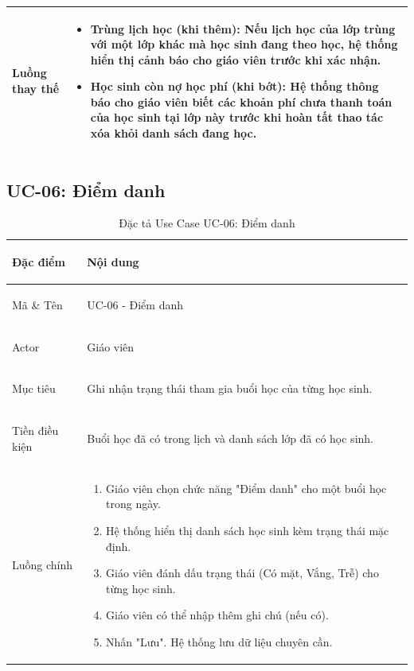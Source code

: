 \begin{table}[h!]
\begin{tabularx}{\textwidth}{|>{\bfseries\raggedright\arraybackslash}p{2.5cm}|X|}
Luồng thay thế & 
\begin{itemize}
    \item \textbf{Trùng lịch học (khi thêm):} Nếu lịch học của lớp trùng với một lớp khác mà học sinh đang theo học, hệ thống hiển thị cảnh báo cho giáo viên trước khi xác nhận.
    \item \textbf{Học sinh còn nợ học phí (khi bớt):} Hệ thống thông báo cho giáo viên biết các khoản phí chưa thanh toán của học sinh tại lớp này trước khi hoàn tất thao tác xóa khỏi danh sách đang học.
\end{itemize} \\ \hline
\end{tabularx}
\end{table}

\clearpage
\subsection{UC-06: Điểm danh}

\begin{table}[htbp]
\centering
\small
\caption{Đặc tả Use Case UC-06: Điểm danh}
\label{tab:uc06-diem-danh}
\begin{tabularx}{\textwidth}{|>{\bfseries\raggedright\arraybackslash}p{2.5cm}|X|}
\hline
Đặc điểm & Nội dung \\ \hline
Mã \& Tên & UC-06 - Điểm danh \\ \hline
Actor & Giáo viên \\ \hline
Mục tiêu & Ghi nhận trạng thái tham gia buổi học của từng học sinh. \\ \hline
Tiền điều kiện & Buổi học đã có trong lịch và danh sách lớp đã có học sinh. \\ \hline
Luồng chính & 
\begin{enumerate}
    \item Giáo viên chọn chức năng "Điểm danh" cho một buổi học trong ngày.
    \item Hệ thống hiển thị danh sách học sinh kèm trạng thái mặc định.
    \item Giáo viên đánh dấu trạng thái (Có mặt, Vắng, Trễ) cho từng học sinh.
    \item Giáo viên có thể nhập thêm ghi chú (nếu có).
    \item Nhấn "Lưu". Hệ thống lưu dữ liệu chuyên cần.
\end{enumerate} \\ \hline
\end{tabularx}
\end{table}

